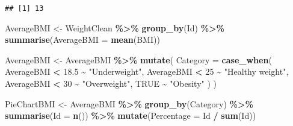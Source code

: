 \documentclass[
]{article}
\newenvironment{Shaded}{\begin{snugshade}}{\end{snugshade}}
\newcommand{\AttributeTok}[1]{\textcolor[rgb]{0.13,0.29,0.53}{#1}}
\newcommand{\ConstantTok}[1]{\textcolor[rgb]{0.56,0.35,0.01}{#1}}
\newcommand{\DecValTok}[1]{\textcolor[rgb]{0.00,0.00,0.81}{#1}}
\newcommand{\FloatTok}[1]{\textcolor[rgb]{0.00,0.00,0.81}{#1}}
\newcommand{\FunctionTok}[1]{\textcolor[rgb]{0.13,0.29,0.53}{\textbf{#1}}}
\newcommand{\NormalTok}[1]{#1}
\newcommand{\OtherTok}[1]{\textcolor[rgb]{0.56,0.35,0.01}{#1}}
\newcommand{\SpecialCharTok}[1]{\textcolor[rgb]{0.81,0.36,0.00}{\textbf{#1}}}
\newcommand{\StringTok}[1]{\textcolor[rgb]{0.31,0.60,0.02}{#1}}
\begin{document}
\begin{verbatim}
## [1] 13
\end{verbatim}

\begin{Shaded}
\begin{Highlighting}[]
\NormalTok{AverageBMI }\OtherTok{\textless{}{-}}\NormalTok{ WeightClean }\SpecialCharTok{\%\textgreater{}\%} 
     \FunctionTok{group\_by}\NormalTok{(Id) }\SpecialCharTok{\%\textgreater{}\%}
     \FunctionTok{summarise}\NormalTok{(}\AttributeTok{AverageBMI =} \FunctionTok{mean}\NormalTok{(BMI))}
\end{Highlighting}
\end{Shaded}

\begin{Shaded}
\begin{Highlighting}[]
\NormalTok{AverageBMI }\OtherTok{\textless{}{-}}\NormalTok{ AverageBMI }\SpecialCharTok{\%\textgreater{}\%}
     \FunctionTok{mutate}\NormalTok{(}
         \AttributeTok{Category =} \FunctionTok{case\_when}\NormalTok{(}
\NormalTok{             AverageBMI }\SpecialCharTok{\textless{}} \FloatTok{18.5} \SpecialCharTok{\textasciitilde{}} \StringTok{"Underweight"}\NormalTok{,}
\NormalTok{             AverageBMI }\SpecialCharTok{\textless{}} \DecValTok{25} \SpecialCharTok{\textasciitilde{}} \StringTok{"Healthy weight"}\NormalTok{,}
\NormalTok{             AverageBMI }\SpecialCharTok{\textless{}} \DecValTok{30} \SpecialCharTok{\textasciitilde{}} \StringTok{"Overweight"}\NormalTok{,}
             \ConstantTok{TRUE} \SpecialCharTok{\textasciitilde{}} \StringTok{"Obesity"}
\NormalTok{          )}
\NormalTok{      )}
\end{Highlighting}
\end{Shaded}

\begin{Shaded}
\begin{Highlighting}[]
\NormalTok{PieChartBMI }\OtherTok{\textless{}{-}}\NormalTok{ AverageBMI }\SpecialCharTok{\%\textgreater{}\%}
    \FunctionTok{group\_by}\NormalTok{(Category) }\SpecialCharTok{\%\textgreater{}\%}
    \FunctionTok{summarise}\NormalTok{(}\AttributeTok{Id =} \FunctionTok{n}\NormalTok{()) }\SpecialCharTok{\%\textgreater{}\%}
    \FunctionTok{mutate}\NormalTok{(}\AttributeTok{Percentage =}\NormalTok{ Id }\SpecialCharTok{/} \FunctionTok{sum}\NormalTok{(Id))}
\end{Highlighting}
\end{Shaded}
\end{document}
